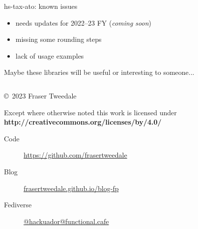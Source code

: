 \documentclass[ignorenonframetext,aspectratio=169,12pt]{beamer}
\begin{document}
\begin{frame}{hs-tax-ato: known issues}
\begin{itemize}
  \item needs updates for 2022--23 FY ({\em coming soon})
  \item missing some rounding steps
  \item lack of usage examples
\end{itemize}

\end{frame}
\begin{frame}[plain]
\centering
\Large
  Maybe these libraries will be useful or interesting to someone...
\end{frame}



\begin{frame}[plain]
\begin{columns}

  \begin{column}{.6\textwidth}

    \setlength{\parskip}{.5em}

    { \centering

    

    \copyright~2023  Fraser Tweedale

    { \scriptsize
    Except where otherwise noted this work is licensed under
    }
    { \footnotesize
    \textbf{http://creativecommons.org/licenses/by/4.0/}
    }

    }

    \begin{description}
      \item[Code] \url{https://github.com/frasertweedale}
      \item[Blog] \href{https://frasertweedale.github.io/blog-fp/}{frasertweedale.github.io/blog-fp}
      \item[Fediverse] \href{https://functional.cafe/@hackuador}{@hackuador@functional.cafe}
    \end{description}
  \end{column}

\end{columns}
\end{frame}
\end{document}
